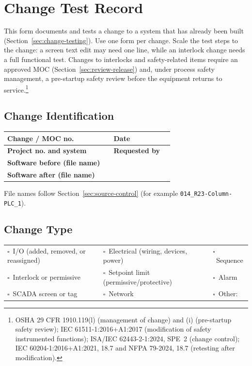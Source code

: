 \chapter{Change Test Record}
\label{app:change-test}
This form documents and tests a change to a system that has already been built (Section~\ref{sec:change-testing}). Use one form per change. Scale the test steps to the change: a screen text edit may need one line, while an interlock change needs a full functional test. Changes to interlocks and safety-related items require an approved MOC (Section~\ref{sec:review-release}) and, under process safety management, a pre-startup safety review before the equipment returns to service.\footnote{OSHA 29 CFR 1910.119(l) (management of change) and (i) (pre-startup safety review); IEC 61511-1:2016+A1:2017 (modification of safety instrumented functions); ISA/IEC 62443-2-1:2024, SPE~2 (change control); IEC 60204-1:2016+A1:2021, 18.7 and NFPA 79-2024, 18.7 (retesting after modification).}

\newcommand{\ctfld}{\rule[-0.30cm]{0pt}{0.80cm}}
\newcommand{\ctcb}{$\square$\ }

\section{Change Identification}
\begin{center}
\begin{tabular}{@{}|P{3.91cm}|P{4.35cm}|P{3.48cm}|P{4.26cm}|@{}}
\hline
\ctfld \textbf{Change / MOC no.} & & \textbf{Date} & \\ \hline
\ctfld \textbf{Project no. and system} & & \textbf{Requested by} & \\ \hline
\ctfld \textbf{Software before (file name)} &  \\ \hline
\ctfld \textbf{Software after (file name)} &  \\ \hline
\end{tabular}
\end{center}
File names follow Section~\ref{sec:source-control} (for example \texttt{014\_R23-Column-PLC\_1}).

\section{Change Type}
\noindent\begin{tabular}{@{}P{5.62cm}P{5.62cm}P{5.68cm}@{}}
\ctcb I/O (added, removed, or reassigned) & \ctcb Electrical (wiring, devices, power) & \ctcb Sequence \\
\ctcb Interlock or permissive & \ctcb Setpoint limit (permissive/protective) & \ctcb Alarm \\
\ctcb SCADA screen or tag & \ctcb Network & \ctcb Other: \underline{\hspace{3cm}} \\
\end{tabular}


